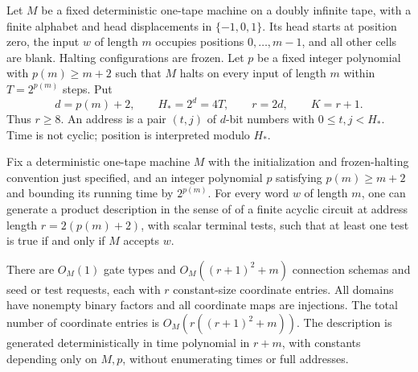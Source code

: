 Let \(M\) be a fixed deterministic one-tape machine on a doubly infinite
tape, with a finite alphabet and head displacements in \(\{-1,0,1\}\).
Its head starts at position zero, the input \(w\) of length \(m\) occupies
positions \(0,\ldots,m-1\), and all other cells are blank. Halting
configurations are frozen. Let \(p\) be a fixed integer polynomial with
\(p(m)\ge m+2\) such that \(M\) halts on every input of length \(m\)
within \(T=2^{p(m)}\) steps. Put
\begin{equation}\label{eq:computation-parameters}
 d=p(m)+2,\qquad H_*=2^d=4T,\qquad r=2d,\qquad K=r+1.
\end{equation}
Thus \(r\ge8\). An address is a pair \((t,j)\) of \(d\)-bit numbers
with \(0\le t,j<H_*\). Time is not cyclic; position is interpreted
modulo \(H_*\).

\begin{proposition}\label{prop:computation}
Fix a deterministic one-tape machine \(M\) with the initialization and
frozen-halting convention just specified, and an integer polynomial \(p\)
satisfying \(p(m)\ge m+2\) and bounding its running time by \(2^{p(m)}\).
For every word \(w\) of length \(m\), one can generate a product description
in the sense of  of a finite acyclic circuit
at address length \(r=2(p(m)+2)\), with scalar terminal tests, such that
at least one test is true if and only if \(M\) accepts \(w\).

There are \(O_M(1)\) gate types and \(O_M((r+1)^2+m)\) connection
schemas and seed or test requests, each with \(r\) constant-size
coordinate entries. All domains have nonempty binary factors and all
coordinate maps are injections. The total number of coordinate entries
is \(O_M(r((r+1)^2+m))\). The description is generated deterministically
in time polynomial in \(r+m\), with constants depending only on \(M,p\),
without enumerating times or full addresses.
\end{proposition}

